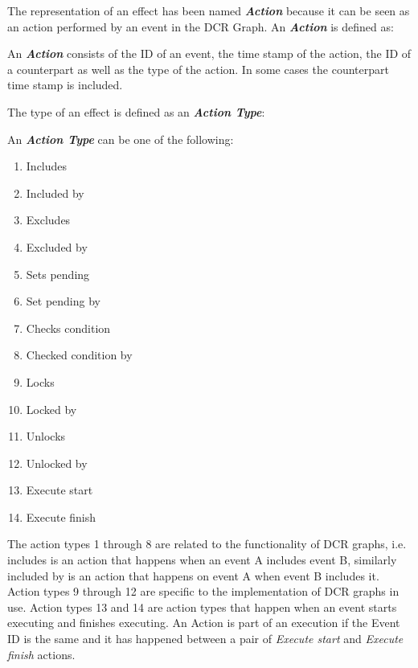 	\newpar The representation of an effect has been named \textit{\textbf{Action}} because it can be seen as an action performed by an event in the DCR Graph. An \textit{\textbf{Action}} is defined as:
	
	\begin{definition}
		An \textit{\textbf{Action}} consists of the ID of an event, the time stamp of the action, the ID of a counterpart as well as  the type of the action. In some cases the counterpart time stamp is included.
	\end{definition}
	
	\newpar	The type of an effect is defined as an \textit{\textbf{Action Type}}:
	
	\begin{definition}
		An \textit{\textbf{Action Type}} can be one of the following:
		\begin{multicols}{3}
			\begin{enumerate}
				\item Includes
				\item Included by
				\item Excludes
				\item Excluded by
				\item Sets pending
				\item Set pending by
				\item Checks condition
				\item Checked condition by
				\item Locks
				\item Locked by
				\item Unlocks
				\item Unlocked by
				\item Execute start
				\item Execute finish
			\end{enumerate}
		\end{multicols}
	\end{definition}
	
	
	\newpar The action types 1 through 8 are related to the functionality of DCR graphs, i.e. includes is an action that happens when an event A includes event B, similarly included by is an action that happens on event A when event B includes it. Action types 9 through 12 are specific to the implementation of DCR graphs in use. Action types 13 and 14 are action types that happen when an event starts executing and finishes executing. An Action is part of an execution if the Event ID is the same and it has happened between a pair of \textit{Execute start} and \textit{Execute finish} actions.
	
